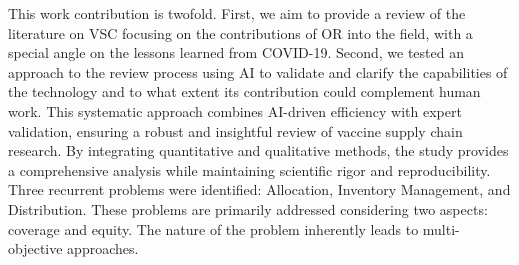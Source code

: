 \documentclass{optica-article}
\begin{document}
This work contribution is twofold. First, we aim to provide a review of the literature on VSC focusing on the contributions of OR into the field, with a special angle on the lessons learned from COVID-19. Second, we tested an approach to the review process using AI to validate and clarify the capabilities of the technology and to what extent its contribution could complement human work. This systematic approach combines AI-driven efficiency with expert validation, ensuring a robust and insightful review of vaccine supply chain research. By integrating quantitative and qualitative methods, the study provides a comprehensive analysis while maintaining scientific rigor and reproducibility. Three recurrent problems were identified: Allocation, Inventory Management, and Distribution. These problems are primarily addressed considering two aspects: coverage and equity. The nature of the problem inherently leads to multi-objective approaches.

 






\end{document}
